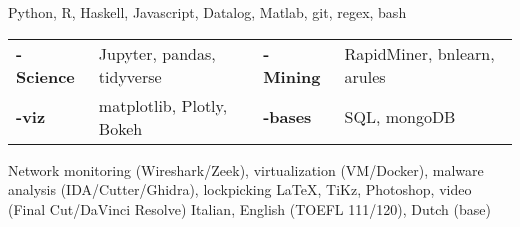 
\begin{cvskills}
        {Python, R, Haskell, Javascript, Datalog, Matlab, git, regex, bash}
        {\begin{tabular}{llll}
            {\bf - Science} & Jupyter, pandas, tidyverse & {\bf - Mining} &RapidMiner, bnlearn, arules \\
            {\bf-viz} & matplotlib, Plotly, Bokeh    & {\bf-bases} & SQL, mongoDB
        \end{tabular}}
        {Network monitoring (Wireshark/Zeek), virtualization (VM/Docker), malware analysis (IDA/Cutter/Ghidra), lockpicking}
        {\LaTeX, TiKz, Photoshop, video (Final Cut/DaVinci Resolve)}
        {Italian, English (TOEFL 111/120), Dutch (base)}
\end{cvskills}
